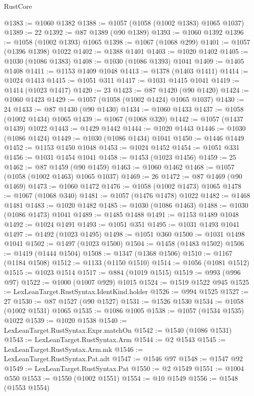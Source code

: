\begin{lexlean}{RustCore}
\begin{coremodule}
@1383 := @1060 @1382
@1388 := @1057 (@1058 (@1002 @1383) @1065 @1037)
@1389 := 22
@1392 := @87 @1389 (@90 @1389)
@1393 := @1060 @1392
@1396 := @1058 (@1002 @1393) @1065
@1398 := @1067 (@1068 @299)
@1401 := @1057 (@1396 @1398) @1022
@1402 := @1388 @1401
@1403 := @1020 @1402
@1405 := @1030 (@1086 @1383)
@1408 := @1030 (@1086 @1393) @1041
@1409 := @1405 @1408
@1411 := @1153 @1409 @1048
@1413 := @1378 (@1403 @1411)
@1414 := @1024 @1413
@1415 := @1051 @311
@1417 := @1031 @1415 @1041
@1419 := @1414 (@1023 @1417)
@1420 := 23
@1423 := @87 @1420 (@90 @1420)
@1424 := @1060 @1423
@1429 := @1057 (@1058 (@1002 @1424) @1065 @1037)
@1430 := 24
@1433 := @87 @1430 (@90 @1430)
@1434 := @1060 @1433
@1437 := @1058 (@1002 @1434) @1065
@1439 := @1067 (@1068 @320)
@1442 := @1057 (@1437 @1439) @1022
@1443 := @1429 @1442
@1444 := @1020 @1443
@1446 := @1030 (@1086 @1424)
@1449 := @1030 (@1086 @1434) @1041
@1450 := @1446 @1449
@1452 := @1153 @1450 @1048
@1453 := @1024 @1452
@1454 := @1051 @331
@1456 := @1031 @1454 @1041
@1458 := @1453 (@1023 @1456)
@1459 := 25
@1462 := @87 @1459 (@90 @1459)
@1463 := @1060 @1462
@1468 := @1057 (@1058 (@1002 @1463) @1065 @1037)
@1469 := 26
@1472 := @87 @1469 (@90 @1469)
@1473 := @1060 @1472
@1476 := @1058 (@1002 @1473) @1065
@1478 := @1067 (@1068 @340)
@1481 := @1057 (@1476 @1478) @1022
@1482 := @1468 @1481
@1483 := @1020 @1482
@1485 := @1030 (@1086 @1463)
@1488 := @1030 (@1086 @1473) @1041
@1489 := @1485 @1488
@1491 := @1153 @1489 @1048
@1492 := @1024 @1491
@1493 := @1051 @351
@1495 := @1031 @1493 @1041
@1497 := @1492 (@1023 @1495)
@1498 := @1051 @360
@1500 := @1031 @1498 @1041
@1502 := @1497 (@1023 @1500)
@1504 := @1458 (@1483 @1502)
@1506 := @1419 (@1444 @1504)
@1508 := @1347 (@1368 @1506)
@1510 := @1167 (@1184 @1508)
@1512 := @1133 (@1150 @1510)
@1514 := @1056 (@1081 @1512)
@1515 := @1023 @1514
@1517 := @884 (@1019 @1515)
@1519 := @993 (@996 @97)
@1522 := @1000 (@1007 @929) @1015
@1524 := @1519 @1522 @945
@1525 := LexLeanTarget.RustSyntax.IdentKind.holder
@1526 := @994 @1525
@1527 := 27
@1530 := @87 @1527 (@90 @1527)
@1531 := @1526 @1530
@1534 := @1058 (@1002 @1531) @1065
@1535 := @1086 @1005
@1538 := @1057 (@1534 @1535) @1022
@1539 := @1020 @1538
@1540 := LexLeanTarget.RustSyntax.Expr.matchOn
@1542 := @1540 (@1086 @1531)
@1543 := LexLeanTarget.RustSyntax.Arm
@1544 := @2 @1543
@1545 := LexLeanTarget.RustSyntax.Arm.mk
@1546 := LexLeanTarget.RustSyntax.Pat.adt
@1547 := @1546 @97
@1548 := @1547 @92
@1549 := LexLeanTarget.RustSyntax.Pat
@1550 := @2 @1549
@1551 := @1004 @550
@1553 := @1550 (@1002 @1551)
@1554 := @10 @1549
@1556 := @1548 (@1553 @1554)

\end{coremodule}
\end{lexlean}
